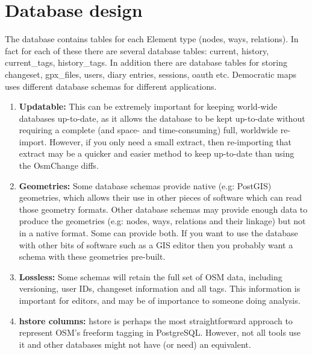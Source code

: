 \section{Database design}
   
The database contains tables for each Element type (nodes, ways, relations). In fact for each of these there are several database tables: current, history, current\_tags, history\_tags. In addition there are database tables for storing changeset, gpx\_files, users, diary entries, sessions, oauth etc.
Democratic maps uses different database schemas for different applications.
\begin{enumerate}
	\item \textbf{Updatable:} This can be extremely important for keeping world-wide databases up-to-date, as it allows the database to be kept up-to-date without requiring a complete (and space- and time-consuming) full, worldwide re-import. However, if you only need a small extract, then re-importing that extract may be a quicker and easier method to keep up-to-date than using the OsmChange diffs.
   
	\item \textbf{Geometries:} Some database schemas provide native (e.g: PostGIS) geometries, which allows their use in other pieces of software which can read those geometry formats. Other database schemas may provide enough data to produce the geometries (e.g: nodes, ways, relations and their linkage) but not in a native format. Some can provide both. If you want to use the database with other bits of software such as a GIS editor then you probably want a schema with these geometries pre-built.
   
    \item \textbf{Lossless:} Some schemas will retain the full set of OSM data, including versioning, user IDs, changeset information and all tags. This information is important for editors, and may be of importance to someone doing analysis.
  
    \item \textbf{hstore columns:} hstore is perhaps the most straightforward approach to represent OSM's freeform tagging in PostgreSQL. However, not all tools use it and other databases might not have (or need) an equivalent.
   
\end{enumerate} 


